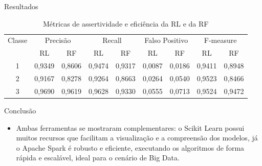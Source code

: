 \documentclass[final,hyperref={pdfpagelabels=false, brazil}]{beamer}
\let\olditem=\item%
\renewcommand{\item}{\olditem \justifying}%
\begin{document}
\begin{frame}[t]
\begin{columns}[t]
\begin{column}{.465\textwidth}
\begin{block}{Resultados}
\begin{itemize}
\begin{itemize}

\begin{table}
\centering
        \caption{Métricas de assertividade e eficiência da RL e da RF}
        \label{multiprogram}
        \begin{tabular}{c | c c | c c | c c|c c } \toprule
             Classe & \multicolumn{2}{|c|}{Precisão} & \multicolumn{2}{|c|}{Recall} & \multicolumn{2}{|c|}{Falso Positivo} & \multicolumn{2}{|c}{F-measure}\\
            \cline{2-9}
             & RL & RF & RL & RF & RL & RF & RL & RF \\
             \hline
            \multicolumn{1}{c|}{1} & 0,9349 & 0,8606 & 0,9474 & 0,9317 & 0,0087 &  0,0186 & 0,9411 & 0,8948\\
            \multicolumn{1}{c|}{2} & 0,9167 & 0,8278 & 0,9264 & 0,8663 & 0,0264 & 0,0540 & 0,9523 & 0,8466\\
            \multicolumn{1}{c|}{3} & 0,9690 & 0,9619 & 0,9628 & 0,9330 & 0,0555 & 0,0713 & 0,9524 & 0,9472\\\bottomrule
        \end{tabular}
    \end{table}


\end{itemize}
\end{itemize}
\end{block}


\begin{block}{Conclus\~ao}

\begin{itemize}
\item Ambas ferramentas se mostraram complementares: o Scikit Learn possui muitos recursos que facilitam a visualização e a compreensão dos modelos, já o Apache Spark é robusto e eficiente, executando os algoritmos de forma rápida e escalável, ideal para o cenário de Big Data.


\end{itemize}
\end{block}
\end{column}
\end{columns}
\end{frame}
\end{document}
